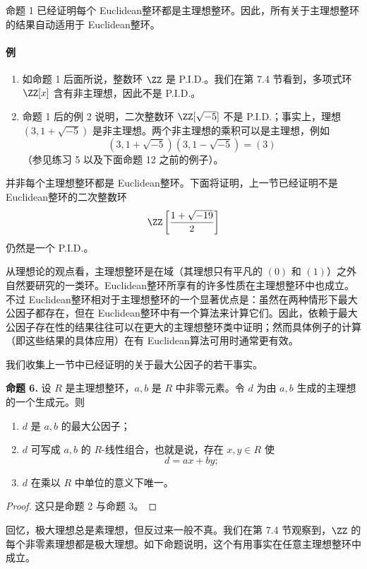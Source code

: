 命题 1 已经证明每个 Euclidean整环都是主理想整环。因此，所有关于主理想整环的结果自动适用于 Euclidean整环。

\paragraph{例}
\begin{enumerate}[label=(\arabic*)]
	\item 如命题 1 后面所说，整数环 $\ZZ$ 是 P.I.D.。我们在第 7.4 节看到，多项式环 $\ZZ[x]$ 含有非主理想，因此不是 P.I.D.。
	\item 命题 1 后的例 2 说明，二次整数环 $\ZZ[\sqrt{-5}]$ 不是 P.I.D.；事实上，理想 $(3,1+\sqrt{-5})$ 是非主理想。两个非主理想的乘积可以是主理想，例如
	\[
	(3,1+\sqrt{-5})(3,1-\sqrt{-5})=(3)
	\]
	（参见练习 5 以及下面命题 12 之前的例子）。
\end{enumerate}

并非每个主理想整环都是 Euclidean整环。下面将证明，上一节已经证明不是 Euclidean整环的二次整数环
\[
\ZZ\left[{1+\sqrt{-19}\over2}\right]
\]
仍然是一个 P.I.D.。

从理想论的观点看，主理想整环是在域（其理想只有平凡的 $(0)$ 和 $(1)$）之外自然要研究的一类环。Euclidean整环所享有的许多性质在主理想整环中也成立。不过 Euclidean整环相对于主理想整环的一个显著优点是：虽然在两种情形下最大公因子都存在，但在 Euclidean整环中有一个算法来计算它们。因此，依赖于最大公因子存在性的结果往往可以在更大的主理想整环类中证明；然而具体例子的计算（即这些结果的具体应用）在有 Euclidean算法可用时通常更有效。

我们收集上一节中已经证明的关于最大公因子的若干事实。

\medskip
\noindent\textbf{命题 6.}
设 $R$ 是主理想整环，$a,b$ 是 $R$ 中非零元素。令 $d$ 为由 $a,b$ 生成的主理想的一个生成元。则
\begin{enumerate}[label=(\arabic*)]
	\item $d$ 是 $a,b$ 的最大公因子；
	\item $d$ 可写成 $a,b$ 的 $R$-线性组合，也就是说，存在 $x,y\in R$ 使
	\[
	d=ax+by;
	\]
	\item $d$ 在乘以 $R$ 中单位的意义下唯一。
\end{enumerate}

\begin{proof}
	这只是命题 2 与命题 3。
\end{proof}

回忆，极大理想总是素理想，但反过来一般不真。我们在第 7.4 节观察到，$\ZZ$ 的每个非零素理想都是极大理想。如下命题说明，这个有用事实在任意主理想整环中成立。


